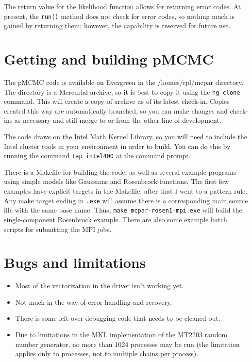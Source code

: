 \documentclass[11pt]{article}
\begin{document}
The return value for the likelihood function allows for returning error codes.
At present, the \texttt{run()} method does not check for error codes,
so nothing much is gained by returning them; however, the capability
is reserved for future use.  

\section{Getting and building {pMCMC}}

The pMCMC code is available on Evergreen in the /homes/rpl/mcpar
directory.  The directory is a Mercurial archive, so it is best to
copy it using the \texttt{hg clone} command.  This will create a copy
of archive as of its latest check-in.  Copies created this way are
automatically branched, so you can make changes and check-ins as
necessary and still merge to or from the other line of development.

The code draws on the Intel Math Kernel Library, so you will need to
include the Intel cluster tools in your environment in order to
build.  You can do this by running the command \texttt{tap intel400}
at the command prompt.

There is a Makefile for building the code, as well as several example
programs using simple models like Gaussians and Rosenbrock functions.
The first few examples have explicit targets in the Makefile; after
that I went to a pattern rule.  Any make target ending in
\texttt{.exe} will assume there is a corresponding main source file
with the same base name.  Thus, \texttt{make mcpar-rosen1-mpi.exe}
will build the single-component Rosenbrock example.  There are also
some example batch scripts for submitting the MPI jobs.

\section{Bugs and limitations}

\begin{itemize}
\item Most of the vectorization in the driver isn't working yet.  
\item Not much in the way of error handling and recovery.
\item There is some left-over debugging code that needs to be cleaned
  out.
\item Due to limitations in the MKL implementation of the MT2203
  random number generator, no more than 1024 processes may be run
  (the limitation applies only to processes, not to multiple chains
  per process).
\end{itemize}
\end{document}
